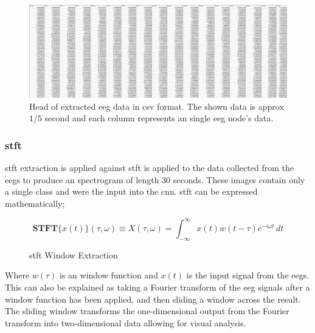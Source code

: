 \documentclass[12pt]{article}
\begin{document}
\begin{figure}[H]
\includegraphics[width=\textwidth]{rawData}
\centering
\caption{Head of extracted \acrshort{eeg} data in \acrshort{csv} format. The shown data is approx $1/5$ second and each column represents an single \acrshort{eeg} node's data.}
\label{fig:rawData}
\end{figure}


\subsubsection{\acrfull{stft}}

\acrshort{stft} extraction is applied against \acrshort{stft} is applied to the data collected from the \acrshort{eegs} to produce an spectrogram of length 30 seconds. These images contain only a single class and were the input into the \acrshort{cnn}. \acrshort{stft} can be expressed mathematically;\\

\begin{figure}[H]
\[  \mathbf{STFT}\{x(t)\}(\tau,\omega) \equiv X(\tau, \omega) = \int_{-\infty}^{\infty} x(t) w(t-\tau) e^{-i \omega t} \, d t   \]
\caption{\acrfull{stft} Window Extraction}
\label{eq:stft}
\end{figure}

Where $w(\tau)$ is an window function and $x(t)$ is the input signal from the \acrshort{eegs}.\\


This can also be explained as taking a Fourier transform of the \acrshort{eeg} signals after a window function has been applied, and then sliding a window across the result. The sliding window transforms the one-dimensional output from the Fourier transform into two-dimensional data allowing for visual analysis.
\end{document}
